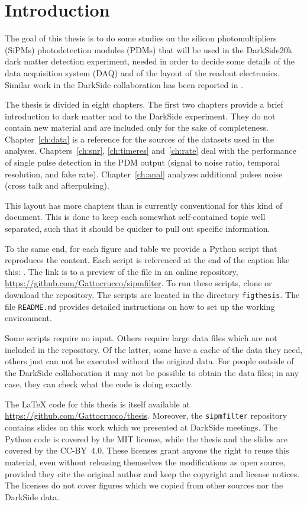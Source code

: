\chapter*{Introduction}

The goal of this thesis is to do some studies on the silicon photomultipliers
(SiPMs) photodetection modules (PDMs) that will be used in the DarkSide20k dark
matter detection experiment, needed in order to decide some details of the data
acquisition system (DAQ) and of the layout of the readout electronics. Similar
work in the DarkSide collaboration has been reported in \cite[chapters~3
and~5]{savarese2018}.


The thesis is divided in eight chapters. The first two chapters provide a brief
introduction to dark matter and to the DarkSide experiment. They do not contain
new material and are included only for the sake of completeness.
Chapter~\ref{ch:data} is a reference for the sources of the datasets used in
the analyses. Chapters~\ref{ch:snr}, \ref{ch:timeres} and~\ref{ch:rate} deal
with the performance of single pulse detection in the PDM output (signal to
noise ratio, temporal resolution, and fake rate). Chapter~\ref{ch:anal}
analyzes additional pulses noise (cross talk and afterpulsing).

This layout has more chapters than is currently conventional for this kind of
document. This is done to keep each somewhat self-contained topic well
separated, such that it should be quicker to pull out specific information.

To the same end, for each figure and table we provide a Python script that
reproduces the content. Each script is referenced at the end of the caption
like this: . The link is to a preview of the file in an
online repository, \url{https://github.com/Gattocrucco/sipmfilter}. To run
these scripts, clone or download the repository. The scripts are located in the
directory \nolinkurl{figthesis}. The file \nolinkurl{README.md} provides detailed
instructions on how to set up the working environment.

Some scripts require no input. Others require large data files which are not
included in the repository. Of the latter, some have a cache of the data they
need, others just can not be executed without the original data. For people
outside of the DarkSide collaboration it may not be possible to obtain the data
files; in any case, they can check what the code is doing exactly.

The \LaTeX{} code for this thesis is itself available at
\url{https://github.com/Gattocrucco/thesis}. Moreover, the
\nolinkurl{sipmfilter} repository contains slides on this work which we
presented at DarkSide meetings. The Python code is covered by the MIT license,
while the thesis and the slides are covered by the CC-BY~4.0. These licenses
grant anyone the right to reuse this material, even without releasing
themselves the modifications as open source, provided they cite the original
author and keep the copyright and license notices. The licenses do not cover
figures which we copied from other sources nor the DarkSide data.
